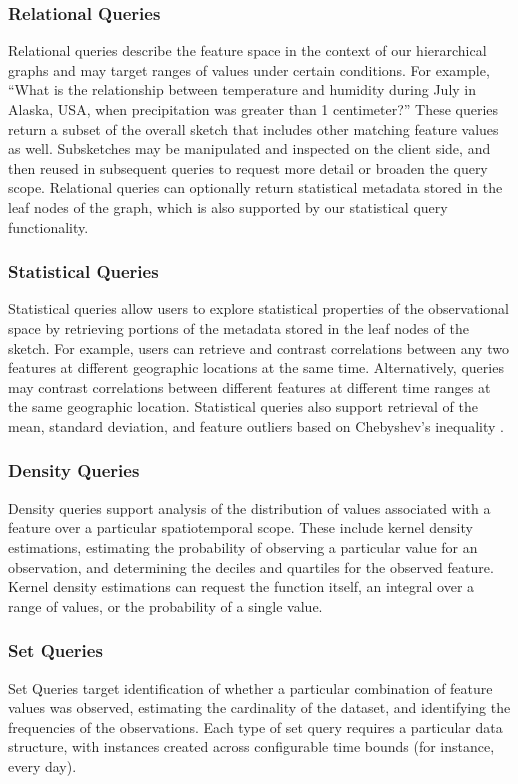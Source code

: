 \subsubsection{Relational Queries}
Relational queries describe the feature space in the context of our hierarchical graphs and may target ranges of values under certain conditions. For example, ``What is the relationship between temperature and humidity during July in Alaska, USA, when precipitation was greater than 1 centimeter?'' These queries return a subset of the overall sketch that includes other matching feature values as well. Subsketches may be manipulated and inspected on the client side, and then reused in subsequent queries to request more detail or broaden the query scope. Relational queries can optionally return statistical metadata stored in the leaf nodes of the graph, which is also supported by our statistical query functionality.

\subsubsection{Statistical Queries}
Statistical queries allow users to explore statistical properties of the observational space by retrieving portions of the metadata stored in the leaf nodes of the sketch. For example, users can retrieve and contrast correlations between any two features at different geographic locations at the same time. Alternatively, queries may contrast correlations between different features at different time ranges at the same geographic location. Statistical queries also support retrieval of the mean, standard deviation, and feature outliers based on Chebyshev's inequality \cite{knuth1968art}.

\subsubsection{Density Queries}
Density queries support analysis of the distribution of values associated with a feature over a particular spatiotemporal scope. These include kernel density estimations, estimating the probability of observing a particular value for an observation, and determining the deciles and quartiles for the observed feature. Kernel density estimations can request the function itself, an integral over a range of values, or the probability of a single value.

\subsubsection{Set Queries}
Set Queries target identification of whether a particular combination of feature values was observed, estimating the cardinality of the dataset, and identifying the frequencies of the observations. Each type of set query requires a particular data structure, with instances created across configurable time bounds (for instance, every day).


